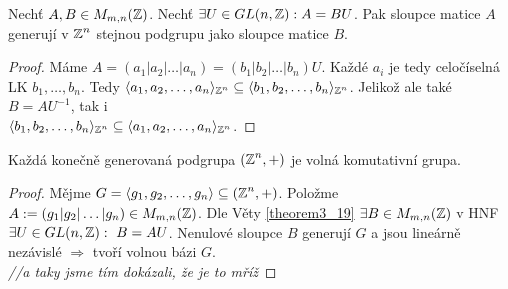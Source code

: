 \begin{claim}
    Nechť $A,B \in M_{m,n}(\operatorname{\mathbb{Z}})$. Nechť $\exists U \in GL(n,\operatorname{\mathbb{Z}}): A = BU$. Pak sloupce matice $A$ generují v $\operatorname{\mathbb{Z}}^n$ stejnou podgrupu jako sloupce matice $B$.
\end{claim}
\begin{proof}
    Máme $A = (a_1 | a_2 | \dots | a_n) = (b_1 | b_2 | \dots | b_n)U$. Každé $a_i$ je tedy celočíselná LK $b_1, \dots, b_n$. Tedy $\langle a_1, a_2, \dots, a_n \rangle_{\operatorname{\mathbb{Z}}^n} \subseteq \langle b_1, b_2, \dots, b_n \rangle_{\operatorname{\mathbb{Z}}^n}$. 
    Jelikož ale také $B = AU^{-1}$, tak i\\$\langle b_1, b_2, \dots, b_n \rangle_{\operatorname{\mathbb{Z}}^n} \subseteq \langle a_1, a_2, \dots, a_n \rangle_{\operatorname{\mathbb{Z}}^n}$.
\end{proof}

\begin{consequence}
    Každá konečně generovaná podgrupa $(\operatorname{\mathbb{Z}}^n, +)$ je volná komutativní grupa.
\end{consequence}
\begin{proof}
    Mějme $G = \langle g_1, g_2, \dots, g_n \rangle \subseteq (\operatorname{\mathbb{Z}}^n,+)$.
    Položme $A:= (g_1 | g_2 | \dots | g_n) \in M_{m,n}(\operatorname{\mathbb{Z}})$.
    Dle Věty \ref{theorem3_19} $\exists B \in M_{m,n}(\operatorname{\mathbb{Z}})$ v HNF $\exists U \in GL(n,\operatorname{\mathbb{Z}}): \ B = AU$. Nenulové sloupce $B$ generují $G$ a jsou lineárně nezávislé $\Rightarrow$ tvoří volnou bázi $G$. \\ \textit{//a taky jsme tím dokázali, že je to mříž}
\end{proof}